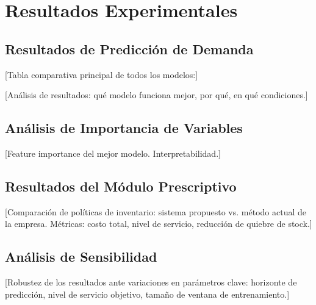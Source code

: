 \section{Resultados Experimentales}
\label{sec:results}

\subsection{Resultados de Predicci\'{o}n de Demanda}
\label{subsec:prediction-results}

[Tabla comparativa principal de todos los modelos:]

%     

[An\'{a}lisis de resultados: qu\'{e} modelo funciona mejor, por qu\'{e}, en qu\'{e} condiciones.]

\subsection{An\'{a}lisis de Importancia de Variables}
\label{subsec:feature-importance}

[Feature importance del mejor modelo. Interpretabilidad.]

\subsection{Resultados del M\'{o}dulo Prescriptivo}
\label{subsec:prescriptive-results}

[Comparaci\'{o}n de pol\'{i}ticas de inventario: sistema propuesto vs. m\'{e}todo actual de la empresa. M\'{e}tricas: costo total, nivel de servicio, reducci\'{o}n de quiebre de stock.]

\subsection{An\'{a}lisis de Sensibilidad}
\label{subsec:sensitivity}

[Robustez de los resultados ante variaciones en par\'{a}metros clave: horizonte de predicci\'{o}n, nivel de servicio objetivo, tama\~{n}o de ventana de entrenamiento.]
